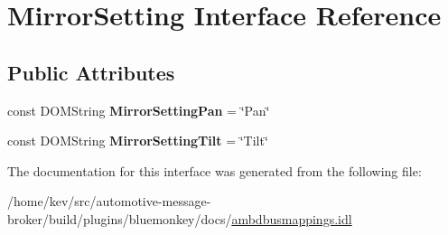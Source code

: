 \hypertarget{interfaceMirrorSetting}{\section{Mirror\+Setting Interface Reference}
\label{interfaceMirrorSetting}
}
\subsection*{Public Attributes}
\begin{DoxyCompactItemize}
\item 
\hypertarget{interfaceMirrorSetting_a428d469aa891fe44d296c08f6410d413}{const D\+O\+M\+String {\bfseries Mirror\+Setting\+Pan} = \char`\"{}Pan\char`\"{}}\label{interfaceMirrorSetting_a428d469aa891fe44d296c08f6410d413}

\item 
\hypertarget{interfaceMirrorSetting_aab9f06a28fc564ada030e60a8ed51b1d}{const D\+O\+M\+String {\bfseries Mirror\+Setting\+Tilt} = \char`\"{}Tilt\char`\"{}}\label{interfaceMirrorSetting_aab9f06a28fc564ada030e60a8ed51b1d}

\end{DoxyCompactItemize}


The documentation for this interface was generated from the following file\+:\begin{DoxyCompactItemize}
\item 
/home/kev/src/automotive-\/message-\/broker/build/plugins/bluemonkey/docs/\hyperlink{ambdbusmappings_8idl}{ambdbusmappings.\+idl}\end{DoxyCompactItemize}
